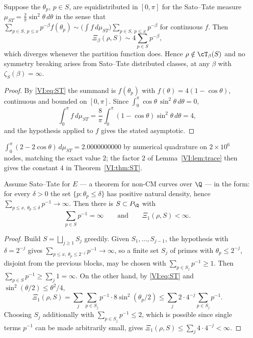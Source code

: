 \begin{theorem}\label{VI:thm:ST}
Suppose the $\theta_p$, $p\in S$, are equidistributed in $[0,\pi]$ for the Sato--Tate measure
$\mu_{ST}=\tfrac2\pi\sin^2\theta\,d\theta$ in the sense that
$\sum_{p\in S,\ p\le x}p^{-\beta}f(\theta_p)\sim\bigl(\int f\,d\mu_{ST}\bigr)\sum_{p\in S,\ p\le x}p^{-\beta}$
for continuous $f$. Then
\[
\Xi_\beta(\rho,S)\sim4\sum_{p\in S}p^{-\beta},
\]
which diverges whenever the partition function does. Hence $\rho\notin\cT_\beta(S)$ and no
symmetry breaking arises from Sato--Tate distributed classes, at any $\beta$ with
$\zeta_S(\beta)=\infty$.
\end{theorem}

\begin{proof}
By \eqref{VI:eq:ST} the summand is $f(\theta_p)$ with $f(\theta)=4(1-\cos\theta)$, continuous
and bounded on $[0,\pi]$. Since $\int_0^\pi\cos\theta\,\sin^2\theta\,d\theta=0$,
\[
\int_0^\pi f\,d\mu_{ST}=\frac{8}{\pi}\int_0^\pi(1-\cos\theta)\sin^2\theta\,d\theta=4 ,
\]
and the hypothesis applied to $f$ gives the stated asymptotic.
\end{proof}

\begin{remark}\label{VI:rem:num2}
$\int_0^\pi(2-2\cos\theta)\,d\mu_{ST}=2.0000000000$ by numerical quadrature on $2\times10^6$
nodes, matching the exact value $2$; the factor $2$ of Lemma~\ref{VI:lem:trace} then gives the
constant $4$ in Theorem~\ref{VI:thm:ST}.
\end{remark}

\begin{theorem}\label{VI:thm:anomalous}
Assume Sato--Tate for $E$ --- a theorem for non-CM curves over $\Q$ \cite{Taylor} --- in
the form: for every $\delta>0$ the set $\{p:\theta_p\le\delta\}$ has positive natural
density, hence
$\sum_{p\le x,\ \theta_p\le\delta}p^{-1}\to\infty$. Then there is $S\subset P_\Q$ with
\[
\sum_{p\in S}p^{-1}=\infty
\qquad\text{and}\qquad
\Xi_1(\rho,S)<\infty .
\]
\end{theorem}

\begin{proof}
Build $S=\bigsqcup_{j\ge1}S_j$ greedily. Given $S_1,\dots,S_{j-1}$, the hypothesis with
$\delta=2^{-j}$ gives $\sum_{p\le x,\ \theta_p\le2^{-j}}p^{-1}\to\infty$, so a finite set
$S_j$ of primes with $\theta_p\le2^{-j}$, disjoint from the previous blocks, may be chosen
with $\sum_{p\in S_j}p^{-1}\ge1$. Then $\sum_{p\in S}p^{-1}\ge\sum_j1=\infty$. On the other
hand, by \eqref{VI:eq:ST} and $\sin^2(\theta/2)\le\theta^2/4$,
\[
\Xi_1(\rho,S)=\sum_j\sum_{p\in S_j}p^{-1}\cdot8\sin^2(\theta_p/2)
\le\sum_j2\cdot4^{-j}\sum_{p\in S_j}p^{-1} .
\]
Choosing $S_j$ additionally with $\sum_{p\in S_j}p^{-1}\le2$, which is possible since single
terms $p^{-1}$ can be made arbitrarily small, gives $\Xi_1(\rho,S)\le\sum_j4\cdot4^{-j}<\infty$.
\end{proof}

